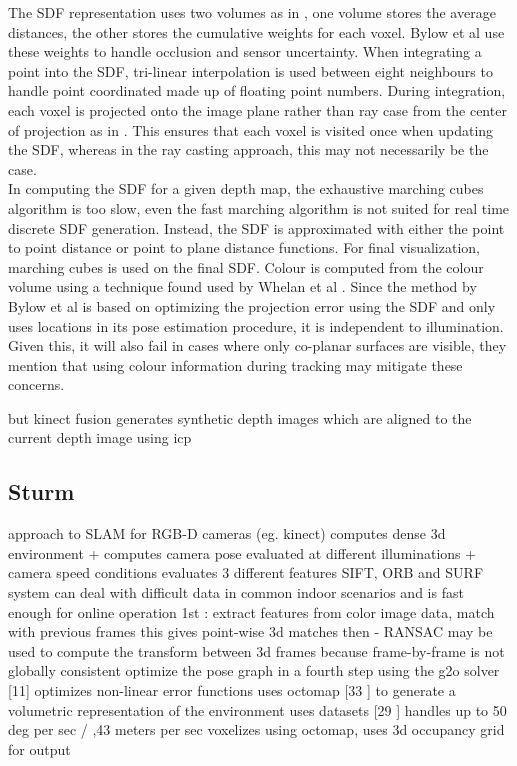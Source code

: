 The SDF representation uses two volumes as in \cite{Curless96Volumetric}, one volume stores the average distances, the other stores the cumulative weights for each voxel. Bylow et al use these weights to handle occlusion and sensor uncertainty. When integrating a point into the SDF, tri-linear interpolation is used between eight neighbours to handle point coordinated made up of floating point numbers. During integration, each voxel is projected onto the image plane rather than ray case from the center of projection as in \cite{Newcombe11Kinectfusion}. This ensures that each voxel is visited once when updating the SDF, whereas in the ray casting approach, this may not necessarily be the case. \\

In computing the SDF for a given depth map, the exhaustive marching cubes algorithm is too slow, even the fast marching algorithm \cite{Baerentzen01Implementation} is not suited for real time discrete SDF generation. Instead, the SDF is approximated with either the point to point distance or point to plane distance functions. For final visualization, marching cubes is used \cite{Lorensen87Marching} on the final SDF. Colour is computed from the colour volume using a technique found used by Whelan et al \cite{Whelan13Robust}. Since the method by Bylow et al is based on optimizing the projection error using the SDF and only uses locations in its pose estimation procedure, it is independent to illumination. Given this, it will also fail in cases where only co-planar surfaces are visible, they mention that using colour information during tracking \cite{Kerl13Robust} may mitigate these concerns.


but kinect fusion generates synthetic depth images which are aligned to the current depth image using icp


\subsection{Sturm}

approach to SLAM for RGB-D cameras (eg. kinect)
computes dense 3d environment + computes camera pose
evaluated at different illuminations + camera speed conditions
evaluates 3 different features SIFT, ORB and SURF
system can deal with difficult data in common indoor scenarios and is fast enough for online operation
1st : extract features from color image data, match with previous frames
this gives point-wise 3d matches
then - RANSAC may be used to compute the transform between 3d frames
because frame-by-frame is not globally consistent
optimize the pose graph in a fourth step using the g2o solver [11] optimizes non-linear error functions
uses octomap [33 \cite{Wurm10Octomap}] to generate a volumetric representation of the environment
uses datasets [29 \cite{Sturm11Towards}]
handles up to 50 deg per sec / ,43 meters per sec
voxelizes using octomap, uses 3d occupancy grid for output

